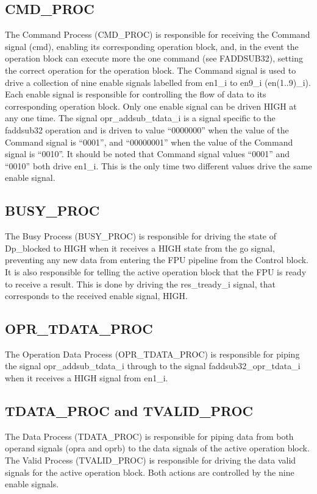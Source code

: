 \documentclass[conference]{IEEEtran}
\begin{document}
\subsection{CMD\_PROC}
The Command Process (CMD\_PROC) is responsible for receiving the Command signal (cmd), enabling its corresponding operation block, and, in the event the operation block can execute more the one command (see FADDSUB32), setting the correct operation for the operation block. The Command signal is used to drive a collection of nine enable signals labelled from en1\_i to en9\_i (en(1..9)\_i). Each enable signal is responsible for controlling the flow of data to its corresponding operation block. Only one enable signal can be driven HIGH at any one time. The signal opr\_addsub\_tdata\_i is a signal specific to the faddsub32 operation and is driven to value “0000000” when the value of the Command signal is “0001”, and “00000001” when the value of the Command signal is “0010”. It should be noted that Command signal values “0001” and “0010” both drive en1\_i. This is the only time two different values drive the same enable signal.

\subsection{BUSY\_PROC}
The Busy Process (BUSY\_PROC) is responsible for driving the state of Dp\_blocked to HIGH when it receives a HIGH state from the go signal, preventing any new data from entering the FPU pipeline from the Control block. It is also responsible for telling the active operation block that the FPU is ready to receive a result. This is done by driving the res\_tready\_i signal, that corresponds to the received enable signal, HIGH.

\subsection{OPR\_TDATA\_PROC}
The Operation Data Process (OPR\_TDATA\_PROC) is responsible for piping the signal opr\_addsub\_tdata\_i through to the signal faddsub32\_opr\_tdata\_i when it receives a HIGH signal from en1\_i.

\subsection{TDATA\_PROC and TVALID\_PROC}
The Data Process (TDATA\_PROC) is responsible for piping data from both operand signals (opra and oprb) to the data signals of the active operation block. The Valid Process (TVALID\_PROC) is responsible for driving the data valid signals for the active operation block. Both actions are controlled by the nine enable signals.
\end{document}
